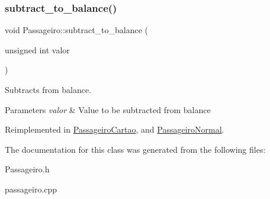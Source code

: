 \subsubsection{\texorpdfstring{subtract\+\_\+to\+\_\+balance()}{subtract\_to\_balance()}}
{\footnotesize\ttfamily void Passageiro\+::subtract\+\_\+to\+\_\+balance (\begin{DoxyParamCaption}\item[{unsigned int}]{valor }\end{DoxyParamCaption})\hspace{0.3cm}{\ttfamily [virtual]}}



Subtracts from balance. 


\begin{DoxyParams}{Parameters}
{\em valor} & Value to be subtracted from balance \\
\hline
\end{DoxyParams}


Reimplemented in \hyperlink{class_passageiro_cartao_ae6d6b0b1b1089b4904a0753c5446baa9}{Passageiro\+Cartao}, and \hyperlink{class_passageiro_normal_ae54a661ff7ac80c35175ef925c460766}{Passageiro\+Normal}.



The documentation for this class was generated from the following files\+:\begin{DoxyCompactItemize}
\item 
Passageiro.\+h\item 
passageiro.\+cpp\end{DoxyCompactItemize}
